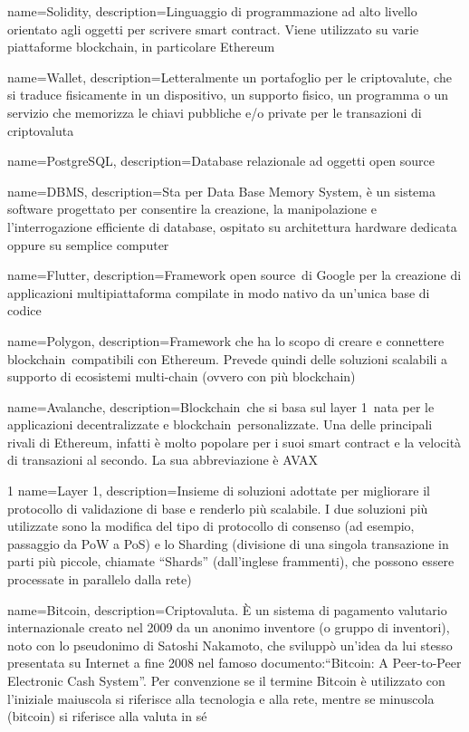 {
	name={Solidity},
	description={Linguaggio di programmazione ad alto livello orientato agli oggetti per scrivere smart contract. Viene utilizzato su varie piattaforme blockchain\glo , in particolare Ethereum}
}

{
	name={Wallet},
	description={Letteralmente un portafoglio per le criptovalute\glo , che si traduce fisicamente in un dispositivo, un supporto fisico, un programma o un servizio che memorizza le chiavi pubbliche e/o private per le transazioni di criptovaluta\glo}
}	

{
	name={PostgreSQL},
	description={Database relazionale ad oggetti open source\glo}
}

{
	name={DBMS},
	description={Sta per Data Base Memory System, è un sistema software progettato per consentire la creazione, la manipolazione e l'interrogazione efficiente di database, ospitato su architettura hardware dedicata oppure su semplice computer}
}

{
	name={Flutter},
	description={Framework open source\glo\ di Google per la creazione di applicazioni multipiattaforma compilate in modo nativo da un’unica base di codice}
}

{
	name={Polygon},
	description={Framework che ha lo scopo di creare e connettere blockchain\glo\ compatibili con Ethereum. Prevede quindi delle soluzioni scalabili a supporto di ecosistemi multi-chain (ovvero con più blockchain\glo)}
}

{
	name={Avalanche},
	description={Blockchain\glo\ che si basa sul layer 1\glo\ nata per le applicazioni decentralizzate e blockchain\glo\ personalizzate. Una delle principali rivali di Ethereum, infatti è molto popolare per i suoi smart contract e la velocità di transazioni al secondo. La sua abbreviazione è AVAX}
}

1
{
	name={Layer 1},
	description={Insieme di soluzioni adottate per migliorare il protocollo di validazione di base e renderlo più scalabile. I due soluzioni più utilizzate sono la modifica del tipo di protocollo di consenso (ad esempio, passaggio da PoW a PoS) e lo Sharding (divisione di una singola transazione in parti più piccole, chiamate “Shards” (dall’inglese frammenti), che possono essere processate in parallelo dalla rete)}
}

{
	name={Bitcoin},
	description={Criptovaluta\glo. È un sistema di pagamento valutario internazionale creato nel 2009 da un anonimo inventore (o gruppo di inventori), noto con lo pseudonimo di Satoshi Nakamoto, che sviluppò un'idea da lui stesso presentata su Internet a fine 2008 nel famoso documento:“Bitcoin: A Peer-to-Peer Electronic Cash System”. Per convenzione se il termine Bitcoin è utilizzato con l'iniziale maiuscola si riferisce alla tecnologia e alla rete, mentre se minuscola (bitcoin) si riferisce alla valuta in sé}
}


